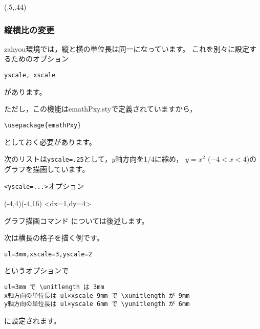\begin{showEx}(.5,.44){}
\fboxsep=0pt%
\end{showEx}

\subsubsection{縦横比の変更}
\textsf{zahyou}環境では，縦と横の単位長は同一になっています。
これを別々に設定するためのオプション
\begin{jquote}
\begin{verbatim}
yscale, xscale
\end{verbatim}
\end{jquote}
があります。

ただし，この機能は\textsf{emathPxy.sty}で定義されていますから，
\begin{jquote}
\begin{verbatim}
\usepackage{emathPxy}
\end{verbatim}
\end{jquote}
としておく必要があります。




次のリストは\verb/yscale=.25/として，$y$軸方向を1/4に縮め，
$y=x^2$ ($-4<x<4$)のグラフを描画しています。

\begin{showEx}{\texttt{<yscale=...>}オプション}
\begin{zahyou}%
  [ul=6mm,yscale=.25]%
  (-4,4)(-4,16)
\def\Fx#1#2{\Mul{#1}{#1}#2}
\yGurafu\Fx\xmin\xmax
\zahyouMemori[g]<dx=1,dy=4>
\end{zahyou}
\end{showEx}

グラフ描画コマンド  については後述します。
\bigskip

次は横長の格子を描く例です。
\begin{jquote}
\begin{verbatim}
ul=3mm,xscale=3,yscale=2
\end{verbatim}
\end{jquote}
というオプションで
\begin{jquote}
\begin{verbatim}
ul=3mm で \unitlength は 3mm
x軸方向の単位長は ul×xscale 9mm で \xunitlength が 9mm
y軸方向の単位長は ul×yscale 6mm で \yunitlength が 6mm
\end{verbatim}
\end{jquote}
に設定されます。

